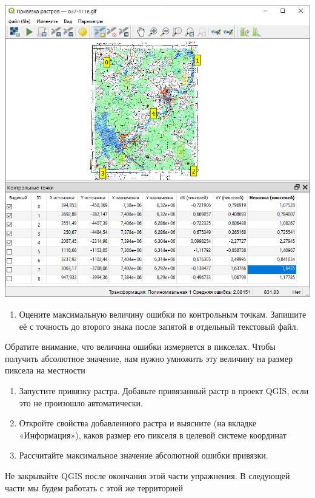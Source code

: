 \documentclass[
  12pt,
]{book}
\providecommand{\tightlist}{%
  \setlength{\itemsep}{0pt}\setlength{\parskip}{0pt}}
\begin{document}
\includegraphics{images/Ex05_Reference/RasterReference4.png}

\begin{enumerate}
\def\labelenumi{\arabic{enumi}.}
\setcounter{enumi}{5}
\tightlist
\item
  Оцените максимальную величину ошибки по контрольным точкам. Запишите её с точность до второго знака после запятой в отдельный текстовый файл.
\end{enumerate}

Обратите внимание, что величина ошибки измеряется в пикселах. Чтобы получить абсолютное значение, нам нужно умножить эту величину на размер пиксела на местности

\begin{enumerate}
\def\labelenumi{\arabic{enumi}.}
\setcounter{enumi}{6}
\item
  Запустите привязку растра. Добавьте привязанный растр в проект QGIS, если это не произошло автоматически.
\item
  Откройте свойства добавленного растра и выясните (на вкладке «Информация»), каков размер его пикселя в целевой системе координат
\item
  Рассчитайте максимальное значение абсолютной ошибки привязки.
\end{enumerate}

Не закрывайте QGIS после окончания этой части упражнения. В следующей части мы будем работать с этой же территорией
\end{document}
